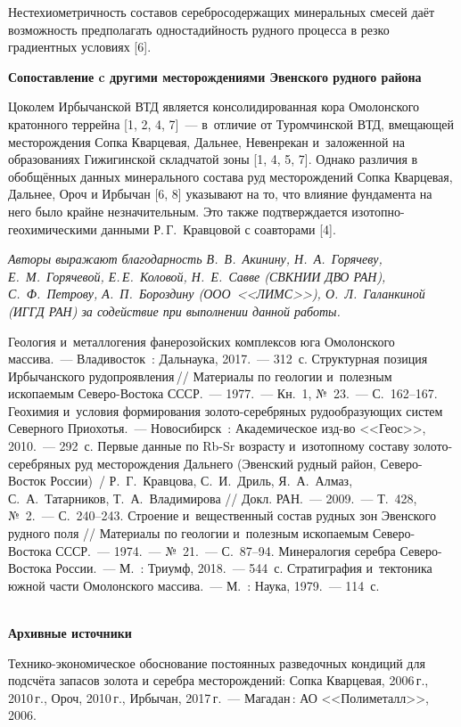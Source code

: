  Нестехиометричность составов серебросодержащих минеральных смесей даёт
 возможность предполагать одностадийность рудного процесса в резко
 градиентных условиях [6].

\textbf{Сопоставление c другими месторождениями Эвенского рудного района}

Цоколем Ирбычанской ВТД является консолидированная кора Омолонского кратонного террейна [1, 2, 4, 7]~--- в~отличие от Туромчинской ВТД, вмещающей месторождения Сопка Кварцевая, Дальнее, Невенрекан и~заложенной на образованиях Гижигинской складчатой зоны [1, 4, 5, 7]. Однако различия в обобщённых данных минерального состава руд
месторождений Сопка Кварцевая, Дальнее, Ороч и Ирбычан [6, 8] указывают на то, что влияние
фундамента на него было крайне незначительным. Это также подтверждается
изотопно-геохимическими данными Р.\,Г.~Кравцовой с соавторами [4].

\textit{Авторы выражают благодарность В.~В.~Акинину,  Н.~А.~Горячеву, Е.~М.~Горячевой, Е.\,Е.~Коловой, Н.~Е.~Савве (СВКНИИ ДВО РАН), С.~Ф.~Петрову, А.~П.~Бороздину (ООО~<<ЛИМС>>), О.~Л.~Галанкиной (ИГГД РАН) за содействие при выполнении данной работы.}


\begin{thebibliography}{99}

\bibitem{}
 Геология и~металлогения фанерозойских комплексов юга Омолонского массива.~--- Владивосток~: Дальнаука, 2017.~--- 312~с.
\bibitem{}
 Структурная позиция Ирбычанского рудопроявления\,// Материалы по геологии и~полезным ископаемым Северо-Востока СССР.~--- 1977.~---  Кн.~1, №~23.~--- С.~162--167.
\bibitem{}
 Геохимия и~условия формирования золото-серебряных рудообразующих систем Северного Приохотья.~--- Новосибирск~: Академическое изд-во <<Геос>>, 2010.~--- 292~с.
\bibitem{}
 Первые данные по Rb-Sr возрасту и~изотопному составу золото-серебряных руд месторождения Дальнего (Эвенский рудный район, Северо-Восток России)~/ Р.~Г.~Кравцова, С.~И.~Дриль, Я.~А.~Алмаз, С.~А.~Татарников, Т.~А.~Владимирова // Докл. РАН.~--- 2009.~--- Т.~428, №~2.~--- С.~240--243.
\bibitem{}
 Строение и~вещественный состав рудных зон Эвенского рудного поля // Материалы по геологии и~полезным ископаемым Северо-Востока СССР.~--- 1974.~--- №~21.~--- С.~87--94.
\bibitem{}
 Минералогия серебра Северо-Востока России.~--- М.~: Триумф, 2018.~--- 544~с.
\bibitem{}
 Стратиграфия и~тектоника южной части Омолонского массива.~--- М.~: Наука, 1979.~--- 114~с.

\textbf{\\Архивные источники}

\bibitem{}Технико-экономическое обоснование постоянных разведочных кондиций для подсчёта запасов золота и серебра месторождений: Сопка Кварцевая, 2006\,г., 2010\,г., Ороч, 2010\,г., Ирбычан, 2017\,г.~--- Магадан\,: АО <<Полиметалл>>, 2006.

\end{thebibliography}
\thispagestyle{empty}
